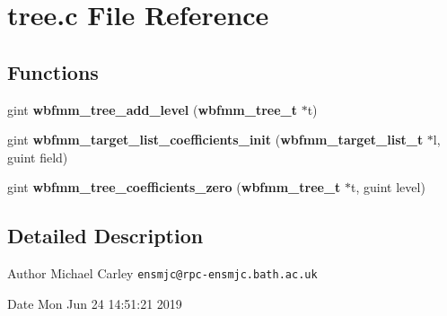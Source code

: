 \section{tree.\+c File Reference}
\label{tree_8c}
\subsection*{Functions}
\begin{DoxyCompactItemize}
\item 
gint {\bf wbfmm\+\_\+tree\+\_\+add\+\_\+level} ({\bf wbfmm\+\_\+tree\+\_\+t} $\ast$t)
\item 
gint {\bf wbfmm\+\_\+target\+\_\+list\+\_\+coefficients\+\_\+init} ({\bf wbfmm\+\_\+target\+\_\+list\+\_\+t} $\ast$l, guint field)
\item 
gint {\bf wbfmm\+\_\+tree\+\_\+coefficients\+\_\+zero} ({\bf wbfmm\+\_\+tree\+\_\+t} $\ast$t, guint level)
\end{DoxyCompactItemize}


\subsection{Detailed Description}
\begin{DoxyAuthor}{Author}
Michael Carley {\tt ensmjc@rpc-\/ensmjc.\+bath.\+ac.\+uk} 
\end{DoxyAuthor}
\begin{DoxyDate}{Date}
Mon Jun 24 14\+:51\+:21 2019 
\end{DoxyDate}
